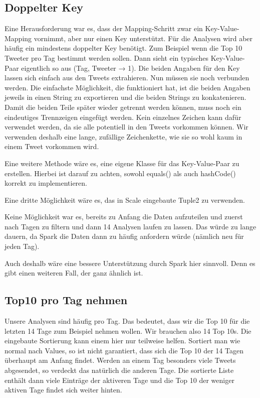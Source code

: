 \subsection{Doppelter Key}
Eine Herausforderung war es, dass der Mapping-Schritt zwar ein
Key-Value-Mapping vornimmt, aber nur einen Key unterstützt. Für die
Analysen wird aber häufig ein mindestens doppelter Key benötigt. Zum
Beispiel wenn die Top 10 Tweeter pro Tag bestimmt werden sollen. Dann
sieht ein typisches Key-Value-Paar eigentlich so aus (Tag, Tweeter →
1). Die beiden Angaben für den Key lassen sich einfach aus den Tweets
extrahieren. Nun müssen sie noch verbunden werden. Die einfachste
Möglichkeit, die funktioniert hat, ist die beiden Angaben jeweils in
einen String zu exportieren und die beiden Strings zu konkatenieren.
Damit die beiden Teile später wieder getrennt werden können, muss noch
ein eindeutiges Trennzeigen eingefügt werden. Kein einzelnes Zeichen
kann dafür verwendet werden, da sie alle potentiell in den Tweets
vorkommen können. Wir verwenden deshalb eine lange, zufällige
Zeichenkette, wie sie so wohl kaum in einem Tweet vorkommen wird.

Eine weitere Methode wäre es, eine eigene Klasse für das Key-Value-Paar
zu erstellen. Hierbei ist darauf zu achten, sowohl equals() als auch
hashCode() korrekt zu implementieren.

Eine dritte Möglichkeit wäre es, das in Scale eingebaute Tuple2 zu
verwenden.

Keine Möglichkeit war es, bereits zu Anfang die Daten aufzuteilen und
zuerst nach Tagen zu filtern und dann 14 Analysen laufen zu lassen. Das
würde zu lange dauern, da Spark die Daten dann zu häufig anfordern
würde (nämlich neu für jeden Tag).

Auch deshalb wäre eine bessere Unterstützung durch Spark hier sinnvoll.
Denn es gibt einen weiteren Fall, der ganz ähnlich ist.

\subsection{Top10 pro Tag nehmen}
Unsere Analysen sind häufig pro Tag. Das bedeutet, dass wir die Top 10
für die letzten 14 Tage zum Beispiel nehmen wollen. Wir brauchen also
14 Top 10s. Die eingebaute Sortierung kann einem hier nur teilweise
helfen. Sortiert man wie normal nach Values, so ist nicht garantiert,
dass sich die Top 10 der 14 Tagen überhaupt am Anfang findet. Werden an
einem Tag besonders viele Tweets abgesendet, so verdeckt das natürlich
die anderen Tage. Die sortierte Liste enthält dann viele Einträge
der aktiveren Tage und die Top 10 der weniger aktiven Tage findet sich
weiter hinten.

